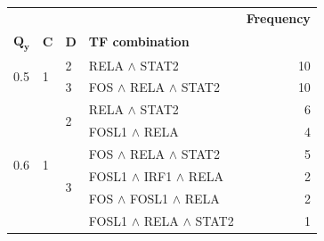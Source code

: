 \begin{tabular}{llllr}
\toprule
 &  &  &  & \textbf{Frequency} \\
$\mathbf{Q_y}$ & $\mathbf{C}$ & $\mathbf{D}$ & \textbf{TF combination} &  \\
\midrule
\multirow[t]{2}{*}{0.5} & \multirow[t]{2}{*}{1} & 2 & {RELA $\wedge$ STAT2} & 10 \\
\cline{3-5}
 &  & 3 & {FOS $\wedge$ RELA $\wedge$ STAT2} & 10 \\
\cline{1-5} \cline{2-5} \cline{3-5}
\multirow[t]{6}{*}{0.6} & \multirow[t]{6}{*}{1} & \multirow[t]{2}{*}{2} & {RELA $\wedge$ STAT2} & 6 \\
 &  &  & {FOSL1 $\wedge$ RELA} & 4 \\
\cline{3-5}
 &  & \multirow[t]{4}{*}{3} & {FOS $\wedge$ RELA $\wedge$ STAT2} & 5 \\
 &  &  & {FOSL1 $\wedge$ IRF1 $\wedge$ RELA} & 2 \\
 &  &  & {FOS $\wedge$ FOSL1 $\wedge$ RELA} & 2 \\
 &  &  & {FOSL1 $\wedge$ RELA $\wedge$ STAT2} & 1 \\
\cline{1-5} \cline{2-5} \cline{3-5}
\bottomrule
\end{tabular}
